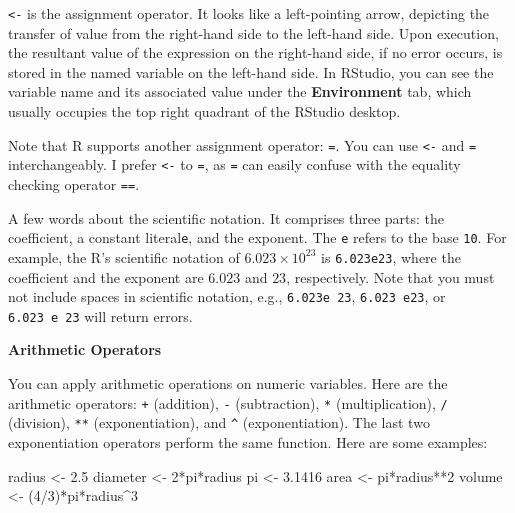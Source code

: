 \documentclass[
  letterpaper,
  DIV=11,
  numbers=noendperiod]{scrreprt}
\newenvironment{Shaded}{\begin{snugshade}}{\end{snugshade}}
\newcommand{\DecValTok}[1]{\textcolor[rgb]{0.68,0.00,0.00}{#1}}
\newcommand{\FloatTok}[1]{\textcolor[rgb]{0.68,0.00,0.00}{#1}}
\newcommand{\NormalTok}[1]{\textcolor[rgb]{0.00,0.23,0.31}{#1}}
\newcommand{\OtherTok}[1]{\textcolor[rgb]{0.00,0.23,0.31}{#1}}
\newcommand{\SpecialCharTok}[1]{\textcolor[rgb]{0.37,0.37,0.37}{#1}}
\begin{document}
\texttt{\textless{}-} is the assignment operator. It looks like a
left-pointing arrow, depicting the transfer of value from the right-hand
side to the left-hand side. Upon execution, the resultant value of the
expression on the right-hand side, if no error occurs, is stored in the
named variable on the left-hand side. In RStudio, you can see the
variable name and its associated value under the \textbf{Environment}
tab, which usually occupies the top right quadrant of the RStudio
desktop.

Note that R supports another assignment operator: \texttt{=}. You can
use \texttt{\textless{}-} and \texttt{=} interchangeably. I prefer
\texttt{\textless{}-} to \texttt{=}, as \texttt{=} can easily confuse
with the equality checking operator \texttt{==}.

A few words about the scientific notation. It comprises three parts: the
coefficient, a constant literal\texttt{e}, and the exponent. The
\texttt{e} refers to the base \texttt{10}. For example, the R's
scientific notation of \(6.023\times10^{23}\) is \texttt{6.023e23},
where the coefficient and the exponent are \(6.023\) and \(23\),
respectively. Note that you must not include spaces in scientific
notation, e.g., \texttt{6.023e\ 23}, \texttt{6.023\ e23}, or
\texttt{6.023\ e\ 23} will return errors.

\textbf{Arithmetic Operators}

You can apply arithmetic operations on numeric variables. Here are the
arithmetic operators: \texttt{+} (addition), \texttt{-} (subtraction),
\texttt{*} (multiplication), \texttt{/} (division), \texttt{**}
(exponentiation), and \texttt{\^{}} (exponentiation). The last two
exponentiation operators perform the same function. Here are some
examples:

\begin{Shaded}
\begin{Highlighting}[]
\NormalTok{radius }\OtherTok{\textless{}{-}} \FloatTok{2.5}
\NormalTok{diameter }\OtherTok{\textless{}{-}} \DecValTok{2}\SpecialCharTok{*}\NormalTok{pi}\SpecialCharTok{*}\NormalTok{radius}
\NormalTok{pi }\OtherTok{\textless{}{-}} \FloatTok{3.1416}
\NormalTok{area }\OtherTok{\textless{}{-}}\NormalTok{ pi}\SpecialCharTok{*}\NormalTok{radius}\SpecialCharTok{**}\DecValTok{2}
\NormalTok{volume }\OtherTok{\textless{}{-}}\NormalTok{ (}\DecValTok{4}\SpecialCharTok{/}\DecValTok{3}\NormalTok{)}\SpecialCharTok{*}\NormalTok{pi}\SpecialCharTok{*}\NormalTok{radius}\SpecialCharTok{\^{}}\DecValTok{3}
\end{Highlighting}
\end{Shaded}
\end{document}
